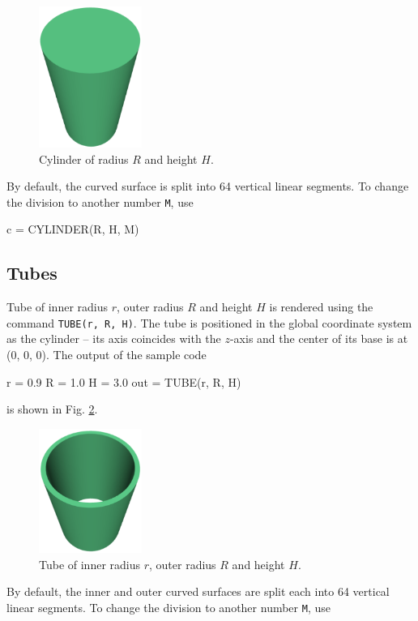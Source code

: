 \begin{figure}[!ht]
\begin{center}
\includegraphics[width=0.3\textwidth]{img/cyl-1.png}
\end{center}
\vspace{-4mm}
\caption{Cylinder of radius $R$ and height $H$.}
\label{fig:cyl-1}
\end{figure}
\noindent
By default, the curved surface is split into 64 vertical linear segments. To 
change the division to another number {\tt M}, use

\begin{bluecode}
c = CYLINDER(R, H, M)
\end{bluecode}

\subsection{Tubes}

Tube of inner radius $r$, outer radius $R$ and height
$H$ is rendered using the command {\tt TUBE(r, R, H)}. 
The tube is positioned in the global coordinate system 
as the cylinder -- its axis coincides with the $z$-axis and 
the center of its base is at (0, 0, 0). 
The output of the sample code

\begin{bluecode}
r = 0.9
R = 1.0
H = 3.0
out = TUBE(r, R, H)
\end{bluecode}
is shown in Fig. \ref{fig:tube-1}.

\begin{figure}[!ht]
\begin{center}
\includegraphics[width=0.3\textwidth]{img/tube-1.png}
\end{center}
\vspace{-4mm}
\caption{Tube of inner radius $r$, outer radius $R$ and height $H$.}
\label{fig:tube-1}
\end{figure}
\noindent
By default, the inner and outer curved surfaces are split each into 64 vertical 
linear segments. To change the division to another number {\tt M}, use

